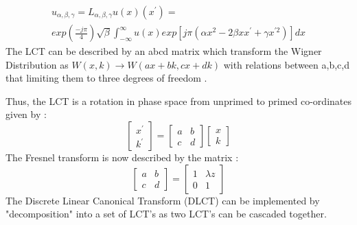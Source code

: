 \documentclass{iucr}              %
\begin{document}
\begin{multline*}
    	u_{\alpha, \beta, \gamma} = L_{\alpha, \beta, \gamma}{u(x)}(x^{'}) = \\ exp(\frac{-j\pi}{4})\sqrt{\beta}\int_{-\infty}^{\infty}u(x)exp[j\pi(\alpha x^{2} - 2\beta xx^{'} + \gamma x^{'2})]dx 
\end{multline*}
The LCT can be described by an abcd matrix which transform the Wigner Distribution as $W(x,k) \rightarrow W(ax+bk,cx+dk)$ with relations between a,b,c,d that limiting them to three degrees of freedom \cite{Hennelly05}. 

Thus, the LCT is a rotation in phase space from unprimed to primed co-ordinates given by \cite{Hennelly05} :
 \begin{equation}
	\begin{bmatrix}
	x^{'}\\
	k^{'}
	\end{bmatrix} = 
	\begin{bmatrix}
	a & b \\
	c & d
	\end{bmatrix}
	\begin{bmatrix}
	x\\
	k
	\end{bmatrix}
\end{equation}
The Fresnel transform is now described by the matrix \cite{Hennelly05} : 
\begin{equation}
    	\begin{bmatrix}
		a & b \\
		c & d
	\end{bmatrix}
	=
	\begin{bmatrix}
	1 & \lambda z \\
	0 & 1
	\end{bmatrix}	
\end{equation}
The Discrete Linear Canonical Transform (DLCT) can be implemented by "decomposition" into a set of LCT's as two LCT's can be cascaded together\cite{Healy2016}.  
\end{document}
